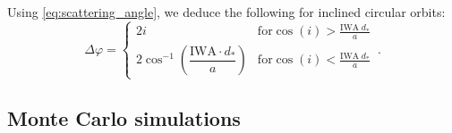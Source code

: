 \documentclass[
    usenatbib,
]{mnras}
\newcommand{\IWA}{\ensuremath{\mathrm{IWA}}}
\begin{document}

Using \cref{eq:scattering_angle}, we deduce the following for inclined 
circular orbits: 
\begin{equation}
\label{eq:Delta_phi_max}
    \Delta \varphi = 
    \begin{cases}
        2 i & \textrm{for} \cos(i) > \frac{\mathrm{IWA}\; d_* }{a} \\ 
        2 \cos^{-1}\left(\dfrac{\mathrm{IWA}\cdot d_* }{a}\right) & \textrm{for} \cos(i) < \frac{\mathrm{IWA}\; d_* }{a}
    \end{cases} \,.
\end{equation}





\subsection{Monte Carlo simulations}
\label{subsec:2.3}
\end{document}
